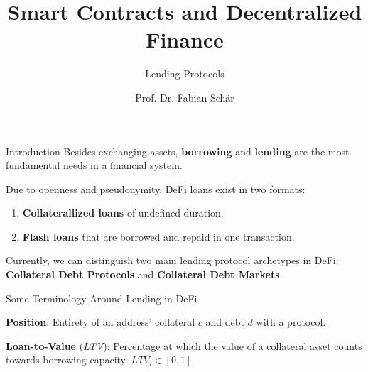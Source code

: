 \documentclass[]{beamer}
\title{Smart Contracts and Decentralized Finance}
\subtitle{Lending Protocols}
\author{Prof. Dr. Fabian Schär}
\institute{University of Basel}
\begin{document}
\thispagestyle{empty}
\begin{frame}[noframenumbering]
	\titlepage
\end{frame}

\begin{frame}{Introduction}
Besides exchanging assets, \textbf{borrowing} and \textbf{lending} are the most fundamental needs in a financial system. \\

\vspace{1em}

 {
Due to openness and pseudonymity, DeFi loans exist in two formats:
\vspace{0.5em}
\begin{enumerate}
  \item \textbf{Collaterallized loans} of undefined duration.
  \item \textbf{Flash loans} that are borrowed and repaid in one transaction. 
\end{enumerate} 
}

 {
\vspace{1em}
Currently, we can distinguish two main lending protocol archetypes in DeFi: \textbf{Collateral Debt Protocols} and \textbf{Collateral Debt Markets}.
}
	
\end{frame}


\begin{frame}{Some Terminology Around Lending in DeFi}

\vspace{1em}

\textbf{Position}: Entirety of an address' collateral $c$ and debt $d$ with a protocol.
			
\vspace{1.0em}
			
 {
\textbf{Loan-to-Value} (\textit{LTV}): Percentage at which the value of a collateral asset counts towards borrowing capacity. $LTV_i \in [0,1]$
}

\vspace{1.0em}


\end{frame}
\end{document}

